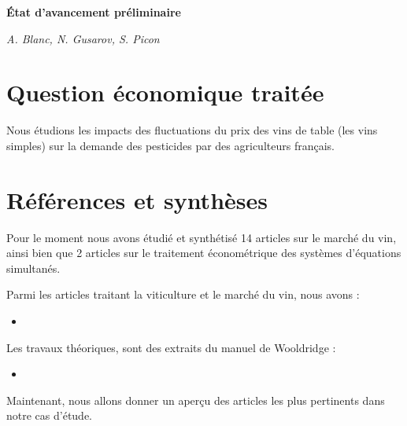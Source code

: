 \documentclass[11pt, a4paper]{article}
\begin{document}
\begin{center}
    \Large\textbf{État d'avancement préliminaire}
    \par
    \large\textit{A. Blanc, N. Gusarov, S. Picon}
\end{center}


\section*{Question économique traitée}
Nous étudions les impacts des fluctuations du prix des vins de table (les vins simples) sur la demande des pesticides par des agriculteurs français.

\section*{Références et synthèses}
Pour le moment nous avons étudié et synthétisé 14 articles sur le marché du vin, ainsi bien que 2 articles sur le traitement économétrique des systèmes d'équations simultanés. 
\par
Parmi les articles traitant la viticulture et le marché du vin, nous avons :
\begin{itemize}
    \item 
\end{itemize}
Les travaux théoriques, sont des extraits du manuel de Wooldridge :
\begin{itemize}
    \item 
\end{itemize}
\par
Maintenant, nous allons donner un aperçu des articles les plus pertinents dans notre cas d'étude.
\subsection*{}
\subsection*{}
\subsection*{}
\end{document}
